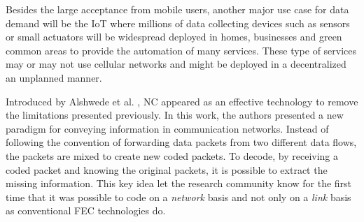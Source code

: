 Besides the large acceptance from mobile users, another major use case for data demand will be the \ac{IoT} where millions of data collecting devices such as sensors or small actuators will be widespread deployed in homes, businesses and green common areas to provide the automation of many services. These type of services may or may not use cellular networks and might be deployed in a decentralized an unplanned manner.  

Introduced by Alshwede et al. \cite{ahlswede2000network}, \ac{NC} appeared as an effective technology to remove the limitations presented previously. In this work, the authors presented a new paradigm for conveying information in communication networks. Instead of following the convention of forwarding data packets from two different data flows, the packets are mixed to create new coded packets. To decode, by receiving a coded packet and knowing the original packets, it is possible to extract the missing information. This key idea let the research community know for the first time that it was possible to code on a \textit{network} basis and not only on a \textit{link} basis as conventional \ac{FEC} technologies do.

